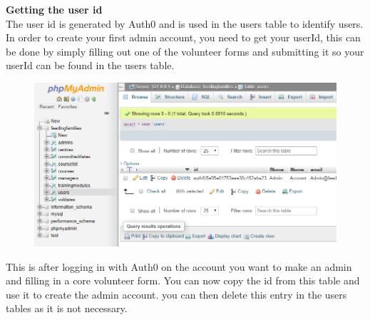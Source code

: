 \documentclass[12pt]{article}
\begin{document}
\noindent
\textbf{Getting the user id}\\
\noindent
The user id is generated by Auth0 and is used in the users table to identify users. In order to create your first admin account, you need to get your userId, this can be done by simply filling out one of the volunteer forms and submitting it so your userId can be found in the users table.
\begin{figure}[H]
    \centering
    \includegraphics[width=1\textwidth]{admins/users.png}
\end{figure}
This is after logging in with Auth0 on the account you want to make an admin and filling in a core volunteer form. You can now copy the id from this table and use it to create the admin account. you can then delete this entry in the users tables as it is not necessary.\\
\end{document}
